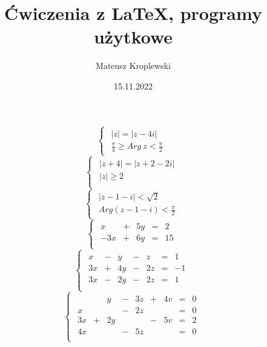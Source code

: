 \documentclass[12pt, a4paper]{article}
\title{Ćwiczenia z LaTeX, programy użytkowe}
\author{Mateusz Kroplewski}
\date{15.11.2022}
\begin{document}
\begin{equation}
\begin{cases}
\begin{array}{l}
|z| = |z-4i| \\
\frac{\pi}{4} \geq Arg\ z < \frac{\pi}{2}
\end{array}
\end{cases}
\end{equation}
\begin{equation}
\begin{cases}
\begin{array}{l}
|z+4| = |z+2-2i| \\
|z| \geq 2 \\
\end{array}
\end{cases}
\end{equation}
\begin{equation}
\begin{cases}
\begin{array}{l}
|z-1-i| < \sqrt{2} \\
Arg(z-1-i) < \frac{\pi}{2}
\end{array}
\end{cases}
\end{equation}
\begin{equation}
\begin{cases}
\begin{array}{rrrrr}
x & + & 5y & = & 2\\
-3x & + & 6y & = & 15\\
\end{array}
\end{cases}
\end{equation}
\begin{equation}
\begin{cases}
\begin{array}{rrrrrrr}
x & - & y & - & z & = & 1\\
3x & + & 4y & - & 2z & = & -1\\
3x & - & 2y & - & 2z & = & 1\\
\end{array}
\end{cases}
\end{equation}
\begin{equation}
\begin{cases}
\begin{array}{rrrrrrrrr}
\ & \ & y & - & 3z & + & 4v & = & 0\\
x & \ & \ & - & 2z & \ & \ & = & 0\\
3x & + & 2y & \ & \ & - & 5v & = & 2\\
4x & \ & \ & - & 5z & \ & \ & = & 0\\
\end{array}
\end{cases}
\end{equation}
\end{document}

